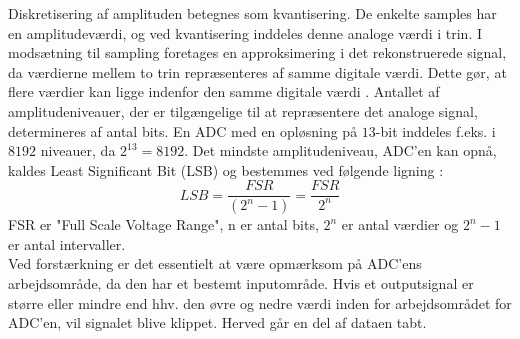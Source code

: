 Diskretisering af amplituden betegnes som kvantisering. De enkelte samples har en amplitudeværdi, og ved kvantisering inddeles denne analoge værdi i trin. I modsætning til sampling foretages en approksimering i det rekonstruerede signal, da værdierne mellem to trin repræsenteres af samme digitale værdi. Dette gør, at flere værdier kan ligge indenfor den samme digitale værdi \cite{Zouridakis2003}. Antallet af amplitudeniveauer, der er tilgængelige til at repræsentere det analoge signal, determineres af antal bits. En ADC med en opløsning på $13$-bit inddeles f.eks. i $8192$ niveauer, da $2^{13}=8192$. \cite{Konrad2006} Det mindste amplitudeniveau, ADC'en kan opnå, kaldes Least Significant Bit (LSB) og bestemmes ved følgende ligning \cite{webster2009,Wolf2004,Aminoff2012}:
\begin{equation}\label{ligningLSB}
LSB = \frac{FSR}{(2^{n}-1)} = \frac{FSR}{2^{n}}
\end{equation}
FSR er "Full Scale Voltage Range", n er antal bits, $2^n$ er antal værdier og $2^{n}-1$ er antal intervaller. \\
Ved forstærkning er det essentielt at være opmærksom på ADC'ens arbejdsområde, da den har et bestemt inputområde. Hvis et outputsignal er større eller mindre end hhv. den øvre og nedre værdi inden for arbejdsområdet for ADC'en, vil signalet blive klippet. Herved går en del af dataen tabt. \cite{webster2009,Wolf2004,Aminoff2012}